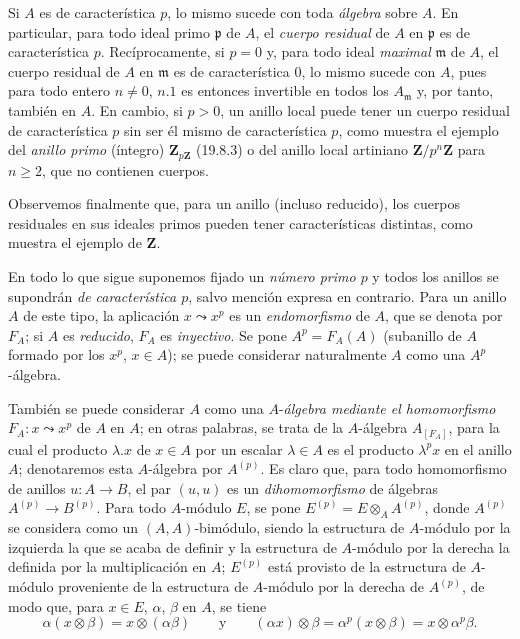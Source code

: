 \begin{env}[21.1.3]
\label{0.21.1.3-fr}
Si $A$ es de característica $p$, lo mismo sucede con toda \emph{álgebra} sobre $A$.
En particular, para todo ideal primo $\mathfrak p$ de $A$, el \emph{cuerpo residual}
de $A$ en $\mathfrak p$ es de característica $p$. Recíprocamente, si $p=0$
y, para todo ideal \emph{maximal} $\mathfrak m$ de $A$, el cuerpo residual de $A$ en
$\mathfrak m$ es de característica $0$, lo mismo sucede con $A$, pues para
todo entero $n\neq0$, $n.1$ es entonces invertible en todos los
$A_{\mathfrak m}$ y, por tanto, también en $A$. En cambio, si $p>0$, un
anillo local puede tener un cuerpo residual de característica $p$ sin ser él
mismo de característica $p$, como muestra el ejemplo del \emph{anillo primo}
(íntegro) $\mathbf Z_{p\mathbf Z}$ (19.8.3) o del anillo local artiniano
$\mathbf Z/p^n\mathbf Z$ para $n\geq2$, que no contienen cuerpos.

Observemos finalmente que, para un anillo (incluso reducido), los cuerpos
residuales en sus ideales primos pueden tener características distintas, como
muestra el ejemplo de $\mathbf Z$.
\end{env}

\begin{env}[21.1.4]
\label{0.21.1.4-fr}
En todo lo que sigue suponemos fijado un \emph{número primo $p$} y todos los anillos
se supondrán \emph{de característica $p$}, salvo mención expresa en contrario. Para
un anillo $A$ de este tipo, la aplicación $x\leadsto x^p$ es un \emph{endomorfismo} de
$A$, que se denota por $F_A$; si $A$ es \emph{reducido}, $F_A$ es \emph{inyectivo}. Se pone
$A^p=F_A(A)$ (subanillo de $A$ formado por los $x^p$, $x\in A$); se puede
considerar naturalmente $A$ como una $A^p$-álgebra.

También se puede considerar $A$ como una $A$-\emph{álgebra mediante el homomorfismo}
$F_A:x\leadsto x^p$ de $A$ en $A$; en otras palabras, se trata de la $A$-álgebra
$A_{[F_A]}$, para la cual el producto $\lambda.x$ de $x\in A$ por un
escalar $\lambda\in A$ es el producto $\lambda^p x$ en el anillo $A$; denotaremos esta $A$-álgebra por $A^{(p)}$. Es
claro que, para todo homomorfismo de anillos $u:A\to B$, el par $(u,u)$ es un
\emph{dihomomorfismo} de álgebras $A^{(p)}\to B^{(p)}$.
Para todo $A$-módulo $E$, se pone $E^{(p)}=E\otimes_A A^{(p)}$, donde
$A^{(p)}$ se considera como un $(A,A)$-bimódulo, siendo la estructura de
$A$-módulo por la izquierda la que se acaba de definir y la estructura de
$A$-módulo por la derecha la definida por la multiplicación en $A$; $E^{(p)}$ está provisto de la estructura de $A$-módulo proveniente de la estructura de $A$-módulo por la derecha de $A^{(p)}$, de modo que,
para $x\in E$, $\alpha$, $\beta$ en $A$, se tiene
\[
  \alpha(x\otimes\beta)=x\otimes(\alpha\beta)\qquad\text{y}\qquad
  (\alpha x)\otimes\beta=\alpha^p(x\otimes\beta)=x\otimes\alpha^p\beta.
\]
\end{env}

